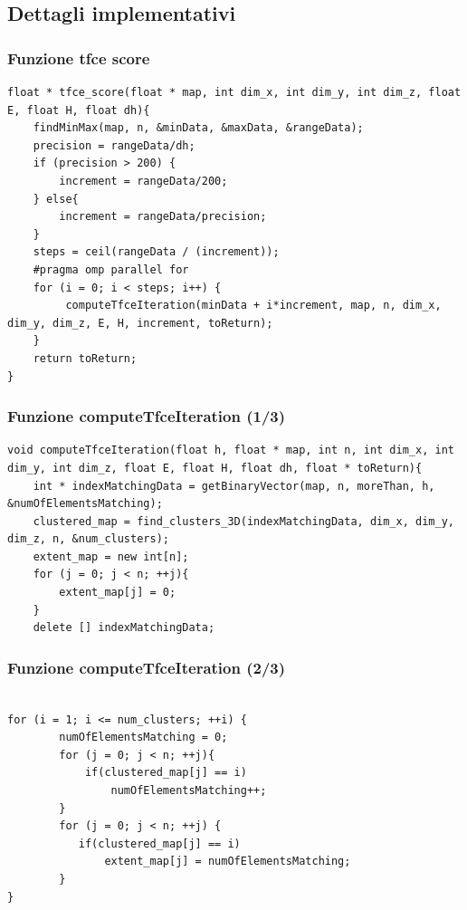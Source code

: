 \documentclass{beamer}
\begin{document}
\subsection{Dettagli implementativi}
\begin{frame}[fragile]
\frametitle{Funzione tfce score}
\begin{center}
\begin{lstlisting}
float * tfce_score(float * map, int dim_x, int dim_y, int dim_z, float E, float H, float dh){
	findMinMax(map, n, &minData, &maxData, &rangeData);
	precision = rangeData/dh;
	if (precision > 200) {
		increment = rangeData/200;
	} else{
		increment = rangeData/precision;	
	}
	steps = ceil(rangeData / (increment));
	#pragma omp parallel for
	for (i = 0; i < steps; i++) {
		 computeTfceIteration(minData + i*increment, map, n, dim_x, dim_y, dim_z, E, H, increment, toReturn);
	}	
	return toReturn;
}
\end{lstlisting}
\end{center}
\end{frame}

\begin{frame}[fragile]
\frametitle{Funzione computeTfceIteration (1/3)}
\begin{center}
\begin{lstlisting}
void computeTfceIteration(float h, float * map, int n, int dim_x, int dim_y, int dim_z, float E, float H, float dh, float * toReturn){
	int * indexMatchingData = getBinaryVector(map, n, moreThan, h, &numOfElementsMatching);
	clustered_map = find_clusters_3D(indexMatchingData, dim_x, dim_y, dim_z, n, &num_clusters);
	extent_map = new int[n];
	for (j = 0; j < n; ++j){
		extent_map[j] = 0;
	}
	delete [] indexMatchingData;
\end{lstlisting}
\end{center}
\end{frame}

\begin{frame}[fragile]
\frametitle{Funzione computeTfceIteration (2/3)}
\begin{center}
\begin{lstlisting}

for (i = 1; i <= num_clusters; ++i) {
		numOfElementsMatching = 0;	
		for (j = 0; j < n; ++j){
		    if(clustered_map[j] == i)
		        numOfElementsMatching++; 
		}
		for (j = 0; j < n; ++j) {
		   if(clustered_map[j] == i)
		       extent_map[j] = numOfElementsMatching; 
		}
}
		      
\end{lstlisting}
\end{center}
\end{frame}
\end{document}
